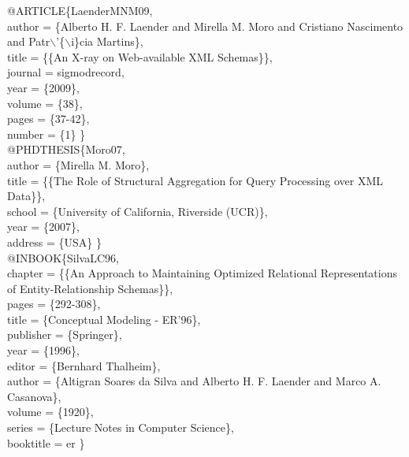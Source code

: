 \documentclass[kdmile,a4paper]{kdmile} %
\newenvironment{latexcode}
{\ttfamily\vspace{0.1in}\setlength{\parindent}{18pt}}
{\vspace{0.1in}}
\begin{document}
\begin{latexcode}
@ARTICLE\{LaenderMNM09,\\\indent\indent
  author = \{Alberto H. F. Laender and Mirella M. Moro and Cristiano Nascimento\\\indent\indent
	and Patr$\backslash$'\{$\backslash$i\}cia Martins\},\\\indent\indent
  title = \{\{An X-ray on Web-available XML Schemas\}\},\\\indent\indent
  journal = sigmodrecord,\\\indent\indent
  year = \{2009\},\\\indent\indent
  volume = \{38\},\\\indent\indent
  pages = \{37-42\},\\\indent\indent
  number = \{1\} \}\\

@PHDTHESIS\{Moro07,\\\indent\indent
  author = \{Mirella M. Moro\},\\\indent\indent
  title = \{\{The Role of Structural Aggregation for Query Processing over XML Data\}\},\\\indent\indent
  school = \{University of California, Riverside (UCR)\},\\\indent\indent
  year = \{2007\},\\\indent\indent
  address = \{USA\} \}\\

@INBOOK\{SilvaLC96,\\\indent\indent
  chapter = \{\{An Approach to Maintaining Optimized Relational Representations\\\indent\indent
	of Entity-Relationship Schemas\}\},\\\indent\indent
  pages = \{292-308\},\\\indent\indent
  title = \{Conceptual Modeling - ER'96\},\\\indent\indent
  publisher = \{Springer\},\\\indent\indent
  year = \{1996\},\\\indent\indent
  editor = \{Bernhard Thalheim\},\\\indent\indent
  author = \{Altigran Soares da Silva and Alberto H. F. Laender and Marco A. Casanova\},\\\indent\indent
  volume = \{1920\},\\\indent\indent
  series = \{Lecture Notes in Computer Science\},\\\indent\indent
  booktitle = er \}
  
\end{latexcode}
\end{document}
